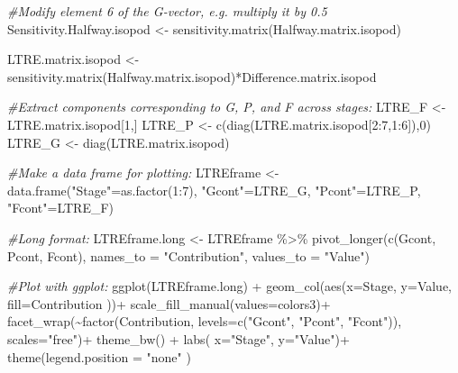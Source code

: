 \documentclass[
]{book}
\newenvironment{Shaded}{\begin{snugshade}}{\end{snugshade}}
\newcommand{\AttributeTok}[1]{\textcolor[rgb]{0.77,0.63,0.00}{#1}}
\newcommand{\CommentTok}[1]{\textcolor[rgb]{0.56,0.35,0.01}{\textit{#1}}}
\newcommand{\DecValTok}[1]{\textcolor[rgb]{0.00,0.00,0.81}{#1}}
\newcommand{\FunctionTok}[1]{\textcolor[rgb]{0.00,0.00,0.00}{#1}}
\newcommand{\NormalTok}[1]{#1}
\newcommand{\OtherTok}[1]{\textcolor[rgb]{0.56,0.35,0.01}{#1}}
\newcommand{\SpecialCharTok}[1]{\textcolor[rgb]{0.00,0.00,0.00}{#1}}
\newcommand{\StringTok}[1]{\textcolor[rgb]{0.31,0.60,0.02}{#1}}
\begin{document}
\begin{Shaded}
\begin{Highlighting}[]
\CommentTok{\#Modify element 6 of the G{-}vector, e.g. multiply it by 0.5}
\NormalTok{Sensitivity.Halfway.isopod }\OtherTok{\textless{}{-}} \FunctionTok{sensitivity.matrix}\NormalTok{(Halfway.matrix.isopod)}

\NormalTok{LTRE.matrix.isopod }\OtherTok{\textless{}{-}} \FunctionTok{sensitivity.matrix}\NormalTok{(Halfway.matrix.isopod)}\SpecialCharTok{*}\NormalTok{Difference.matrix.isopod}

\CommentTok{\#Extract components corresponding to G, P, and F across stages:}
\NormalTok{LTRE\_F }\OtherTok{\textless{}{-}}\NormalTok{ LTRE.matrix.isopod[}\DecValTok{1}\NormalTok{,] }
\NormalTok{LTRE\_P }\OtherTok{\textless{}{-}} \FunctionTok{c}\NormalTok{(}\FunctionTok{diag}\NormalTok{(LTRE.matrix.isopod[}\DecValTok{2}\SpecialCharTok{:}\DecValTok{7}\NormalTok{,}\DecValTok{1}\SpecialCharTok{:}\DecValTok{6}\NormalTok{]),}\DecValTok{0}\NormalTok{)}
\NormalTok{LTRE\_G }\OtherTok{\textless{}{-}} \FunctionTok{diag}\NormalTok{(LTRE.matrix.isopod)}
  

\CommentTok{\#Make a data frame for plotting:}
\NormalTok{LTREframe }\OtherTok{\textless{}{-}} \FunctionTok{data.frame}\NormalTok{(}\StringTok{"Stage"}\OtherTok{=}\FunctionTok{as.factor}\NormalTok{(}\DecValTok{1}\SpecialCharTok{:}\DecValTok{7}\NormalTok{), }\StringTok{"Gcont"}\OtherTok{=}\NormalTok{LTRE\_G, }\StringTok{"Pcont"}\OtherTok{=}\NormalTok{LTRE\_P, }\StringTok{"Fcont"}\OtherTok{=}\NormalTok{LTRE\_F)}

\CommentTok{\#Long format:}
\NormalTok{LTREframe.long }\OtherTok{\textless{}{-}}\NormalTok{ LTREframe }\SpecialCharTok{\%\textgreater{}\%} \FunctionTok{pivot\_longer}\NormalTok{(}\FunctionTok{c}\NormalTok{(Gcont, Pcont, Fcont), }\AttributeTok{names\_to =} \StringTok{"Contribution"}\NormalTok{, }\AttributeTok{values\_to =} \StringTok{"Value"}\NormalTok{)}
 

\CommentTok{\#Plot with ggplot:}
\FunctionTok{ggplot}\NormalTok{(LTREframe.long) }\SpecialCharTok{+} 
  \FunctionTok{geom\_col}\NormalTok{(}\FunctionTok{aes}\NormalTok{(}\AttributeTok{x=}\NormalTok{Stage, }\AttributeTok{y=}\NormalTok{Value, }\AttributeTok{fill=}\NormalTok{Contribution ))}\SpecialCharTok{+}
  \FunctionTok{scale\_fill\_manual}\NormalTok{(}\AttributeTok{values=}\NormalTok{colors3)}\SpecialCharTok{+}
  \FunctionTok{facet\_wrap}\NormalTok{(}\SpecialCharTok{\textasciitilde{}}\FunctionTok{factor}\NormalTok{(Contribution, }\AttributeTok{levels=}\FunctionTok{c}\NormalTok{(}\StringTok{"Gcont"}\NormalTok{, }\StringTok{"Pcont"}\NormalTok{, }\StringTok{"Fcont"}\NormalTok{)), }\AttributeTok{scales=}\StringTok{"free"}\NormalTok{)}\SpecialCharTok{+}
  \FunctionTok{theme\_bw}\NormalTok{() }\SpecialCharTok{+}
  \FunctionTok{labs}\NormalTok{( }\AttributeTok{x=}\StringTok{"Stage"}\NormalTok{, }\AttributeTok{y=}\StringTok{"Value"}\NormalTok{)}\SpecialCharTok{+}
  \FunctionTok{theme}\NormalTok{(}\AttributeTok{legend.position =} \StringTok{"none"}\NormalTok{ ) }
\end{Highlighting}
\end{Shaded}
\end{document}

